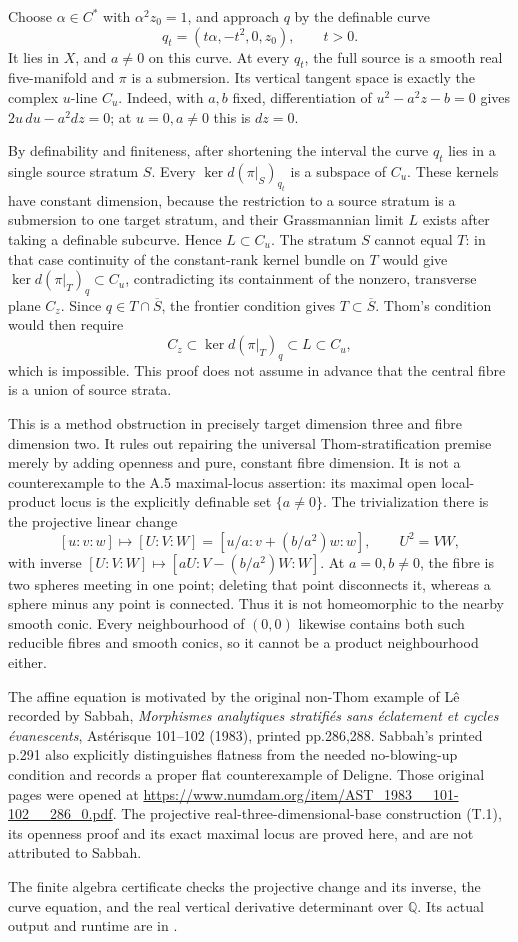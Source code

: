 Choose \(\alpha\in C^*\) with \(\alpha^2z_0=1\), and approach \(q\)
by the definable curve
\[
 q_t=(t\alpha,-t^2,0,z_0),\qquad t>0.
 \tag{T.2}
\]
It lies in \(X\), and \(a\ne0\) on this curve.  At every \(q_t\),
the full source is a smooth real five-manifold and \(\pi\) is a
submersion.  Its vertical tangent space is exactly the complex
\(u\)-line \(C_u\).  Indeed, with \(a,b\) fixed, differentiation of
\(u^2-a^2z-b=0\) gives \(2u\,du-a^2dz=0\); at \(u=0,a\ne0\)
this is \(dz=0\).

By definability and finiteness, after shortening the interval the
curve \(q_t\) lies in a single source stratum \(S\).  Every
\(\ker d(\pi|_S)_{q_t}\) is a subspace of \(C_u\).  These kernels
have constant dimension, because the restriction to a source stratum
is a submersion to one target stratum, and their Grassmannian limit
\(L\) exists after taking a definable subcurve.  Hence \(L\subset C_u\).
The stratum \(S\) cannot equal \(T\): in that case continuity of the
constant-rank kernel bundle on \(T\) would give
\(\ker d(\pi|_T)_q\subset C_u\), contradicting its containment of
the nonzero, transverse plane \(C_z\).  Since \(q\in T\cap\overline S\),
the frontier condition gives \(T\subset\overline S\).
Thom's condition would then require
\[
                 C_z\subset\ker d(\pi|_T)_q
                          \subset L\subset C_u,
\]
which is impossible.  This proof does not assume in advance that
the central fibre is a union of source strata.

This is a method obstruction in precisely target dimension three
and fibre dimension two.  It rules out repairing the universal
Thom-stratification premise merely by adding openness and pure,
constant fibre dimension.  It is not a counterexample to the A.5
maximal-locus assertion: its maximal open local-product locus is
the explicitly definable set \(\{a\ne0\}\).  The trivialization there
is the projective linear change
\[
 [u:v:w]\longmapsto
       [U:V:W]=[u/a:v+(b/a^2)w:w],
 \qquad U^2=VW,
 \tag{T.3}
\]
with inverse \([U:V:W]\mapsto[aU:V-(b/a^2)W:W]\).
At \(a=0,b\ne0\), the fibre is two spheres meeting in one point;
deleting that point disconnects it, whereas a sphere minus any
point is connected.  Thus it is not homeomorphic to the nearby
smooth conic.  Every neighbourhood of \((0,0)\) likewise contains
both such reducible fibres and smooth conics, so it cannot be a
product neighbourhood either.

The affine equation is motivated by the original non-Thom example
of L\^e recorded by Sabbah, \emph{Morphismes analytiques stratifi\'es
sans \'eclatement et cycles \'evanescents}, Ast\'erisque 101--102
(1983), printed pp.286,288.  Sabbah's printed p.291 also explicitly
distinguishes flatness from the needed no-blowing-up condition and
records a proper flat counterexample of Deligne.  Those original
pages were opened at
\url{https://www.numdam.org/item/AST_1983__101-102__286_0.pdf}.
The projective real-three-dimensional-base construction (T.1),
its openness proof and its exact maximal locus are proved here,
and are not attributed to Sabbah.

The finite algebra certificate 
checks the projective change and its inverse, the curve equation,
and the real vertical derivative determinant over \(\mathbb Q\).
Its actual output and runtime are in
.
